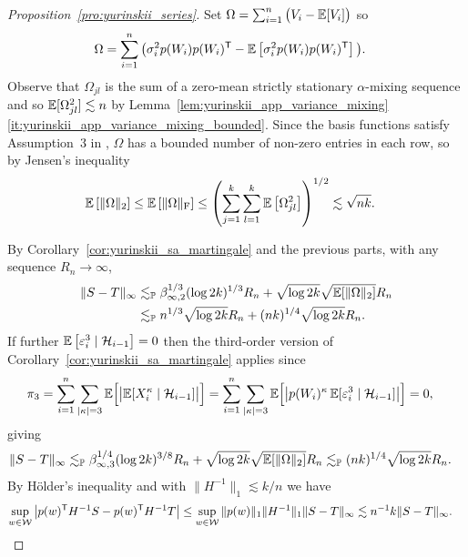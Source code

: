 \begin{proof}[Proposition~\ref{pro:yurinskii_series}]
  Set $\Omega = \sum_{i=1}^n \big(V_i - \mathbb{E}[V_i] \big)$ so
  \begin{align*}
    \Omega
    &= \sum_{i=1}^n
    \big(\sigma_i^2 p(W_i)p(W_i)^{\mathsf{T}} - \mathbb{E}\left[ \sigma_i^2 p(W_i)p(W_i)^{\mathsf{T}}
    \right]\big).
  \end{align*}
  Observe that $\Omega_{j l}$ is the sum of a zero-mean
  strictly stationary $\alpha$-mixing sequence and so $\mathbb{E}[\Omega_{j l}^2]
  \lesssim n$ by
  Lemma~\ref{lem:yurinskii_app_variance_mixing}%
  \ref{it:yurinskii_app_variance_mixing_bounded}.
  Since the basis functions
  satisfy Assumption~3 in \citet{cattaneo2020large}, $\Omega$ has a bounded
  number of non-zero entries in each row, so by Jensen's inequality
  \begin{align*}
    \mathbb{E}\left[
      \|\Omega\|_2
    \right]
    &\leq
    \mathbb{E}\left[
      \|\Omega\|_{\mathrm{F}}
    \right]
    \leq
    \left(
      \sum_{j=1}^k
      \sum_{l=1}^k
      \mathbb{E}\left[
        \Omega_{j l}^2
      \right]
    \right)^{1/2}
    \lesssim \sqrt{n k}.
  \end{align*}


  By Corollary~\ref{cor:yurinskii_sa_martingale} and the previous parts,
  with any sequence $R_n \to \infty$,
  \begin{align*}
    \|S - T \|_\infty
    &\lesssim_{\mathbb{P}}
    \beta_{\infty,2}^{1/3} (\log 2k)^{1/3} R_n
    + \sqrt{\log 2k} \sqrt{\mathbb{E}[\|\Omega\|_2]} R_n \\
    &\lesssim_{\mathbb{P}}
    n^{1/3} \sqrt{\log 2k} R_n
    + (n k)^{1/4} \sqrt{\log 2k} R_n.
  \end{align*}
  If further $\mathbb{E} \left[ \varepsilon_i^3 \mid \mathcal{H}_{i-1} \right] = 0$ then
  the third-order version of Corollary~\ref{cor:yurinskii_sa_martingale}
  applies since
  \begin{align*}
    \pi_3
    &=
    \sum_{i=1}^{n}
    \sum_{|\kappa| = 3}
    \mathbb{E} \Big[ \big|
      \mathbb{E} [ X_i^\kappa \mid \mathcal{H}_{i-1} ]
    \big| \Big]
    =
    \sum_{i=1}^{n}
    \sum_{|\kappa| = 3}
    \mathbb{E} \Big[ \big|
      p(W_i)^\kappa \,
      \mathbb{E} [ \varepsilon_i^3 \mid \mathcal{H}_{i-1} ]
    \big| \Big]
    = 0,
  \end{align*}
  giving
  \begin{align*}
    \|S - T \|_\infty
    &\lesssim_{\mathbb{P}}
    \beta_{\infty,3}^{1/4} (\log 2k)^{3/8} R_n
    + \sqrt{\log 2k} \sqrt{\mathbb{E}[\|\Omega\|_2]} R_n
    \lesssim_{\mathbb{P}}
    (n k)^{1/4} \sqrt{\log 2k} R_n.
  \end{align*}
  By H{\"o}lder's inequality and with
  $\|H^{-1}\|_1 \lesssim k/n$ we have
  \begin{align*}
    \sup_{w \in \mathcal{W}}
    \left|
    p(w)^{\mathsf{T}} H^{-1} S
    - p(w)^{\mathsf{T}} H^{-1} T
    \right|
    &\leq
    \sup_{w \in \mathcal{W}}
    \|p(w)\|_1
    \|H^{-1}\|_1
    \| S - T \|_\infty
    \lesssim
    n^{-1} k
    \| S - T \|_\infty.
  \end{align*}


\end{proof}
